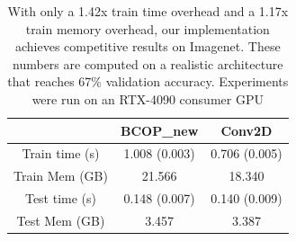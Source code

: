 

\begin{table}[h!]
    \centering
    \begin{tabular}{c|cc}
        \hline
         & \textbf{BCOP\_new} & \textbf{Conv2D} \\
        \hline
        Train time (s) & 1.008 (0.003) & 0.706 (0.005) \\
        Train Mem (GB) & 21.566 & 18.340 \\
        Test time (s) & 0.148 (0.007) & 0.140 (0.009) \\
        Test Mem (GB) & 3.457 & 3.387 \\
    \end{tabular}
    \caption{With only a 1.42x train time overhead and a 1.17x train memory overhead, our implementation achieves competitive results on Imagenet. These numbers are computed on a realistic architecture that reaches 67\% validation accuracy. Experiments were run on an RTX-4090 consumer GPU}
    \label{tab:comparison}
\end{table}
